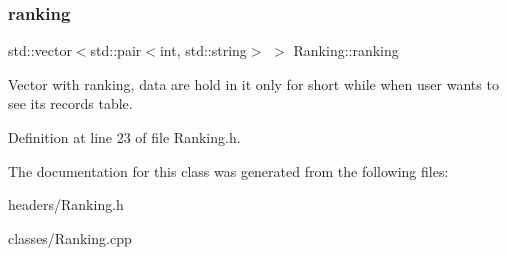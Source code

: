 \subsubsection{\texorpdfstring{ranking}{ranking}}
{\footnotesize\ttfamily std\+::vector$<$std\+::pair$<$int, std\+::string$>$ $>$ Ranking\+::ranking\hspace{0.3cm}{\ttfamily [private]}}

Vector with ranking, data are hold in it only for short while when user wants to see its records table. 

Definition at line 23 of file Ranking.\+h.



The documentation for this class was generated from the following files\+:\begin{DoxyCompactItemize}
\item 
headers/Ranking.\+h\item 
classes/Ranking.\+cpp\end{DoxyCompactItemize}
